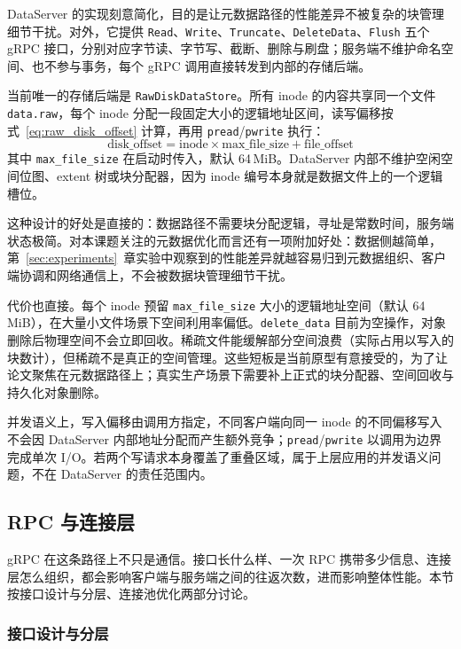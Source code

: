 DataServer 的实现刻意简化，目的是让元数据路径的性能差异不被复杂的块管理细节干扰。对外，它提供 \texttt{Read}、\texttt{Write}、\texttt{Truncate}、\texttt{DeleteData}、\texttt{Flush} 五个 gRPC 接口，分别对应字节读、字节写、截断、删除与刷盘；服务端不维护命名空间、也不参与事务，每个 gRPC 调用直接转发到内部的存储后端。

当前唯一的存储后端是 \texttt{RawDiskDataStore}。所有 inode 的内容共享同一个文件 \texttt{data.raw}，每个 inode 分配一段固定大小的逻辑地址区间，读写偏移按式~\ref{eq:raw_disk_offset} 计算，再用 \texttt{pread}/\texttt{pwrite} 执行：
\begin{equation}
    \mathrm{disk\_offset} = \mathrm{inode} \times \mathrm{max\_file\_size} + \mathrm{file\_offset}
    \label{eq:raw_disk_offset}
\end{equation}
其中 \texttt{max\_file\_size} 在启动时传入，默认 64\,MiB。DataServer 内部不维护空闲空间位图、extent 树或块分配器，因为 inode 编号本身就是数据文件上的一个逻辑槽位。

这种设计的好处是直接的：数据路径不需要块分配逻辑，寻址是常数时间，服务端状态极简。对本课题关注的元数据优化而言还有一项附加好处：数据侧越简单，第~\ref{sec:experiments}~章实验中观察到的性能差异就越容易归到元数据组织、客户端协调和网络通信上，不会被数据块管理细节干扰。

代价也直接。每个 inode 预留 \texttt{max\_file\_size} 大小的逻辑地址空间（默认 64\,MiB），在大量小文件场景下空间利用率偏低。\texttt{delete\_data} 目前为空操作，对象删除后物理空间不会立即回收。稀疏文件能缓解部分空间浪费（实际占用以写入的块数计），但稀疏不是真正的空间管理。这些短板是当前原型有意接受的，为了让论文聚焦在元数据路径上；真实生产场景下需要补上正式的块分配器、空间回收与持久化对象删除。

并发语义上，写入偏移由调用方指定，不同客户端向同一 inode 的不同偏移写入不会因 DataServer 内部地址分配而产生额外竞争；\texttt{pread}/\texttt{pwrite} 以调用为边界完成单次 I/O。若两个写请求本身覆盖了重叠区域，属于上层应用的并发语义问题，不在 DataServer 的责任范围内。

\subsection{RPC 与连接层}
\label{sec:impl_rpc}

gRPC 在这条路径上不只是通信。接口长什么样、一次 RPC 携带多少信息、连接层怎么组织，都会影响客户端与服务端之间的往返次数，进而影响整体性能。本节按接口设计与分层、连接池优化两部分讨论。

\subsubsection{接口设计与分层}

